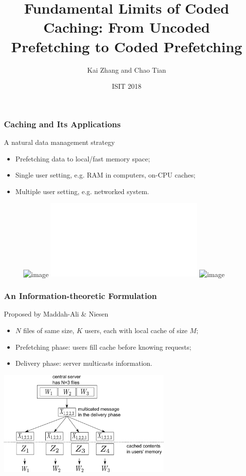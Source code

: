 \documentclass{beamer}
\title[About Beamer] %
{Fundamental Limits of Coded Caching: From Uncoded Prefetching to Coded Prefetching}
\author{Kai Zhang and Chao Tian}
\institute{Texas A\&M University}
\date{ISIT 2018}
\begin{document}
\frame{\titlepage}

\begin{frame}
\frametitle{Caching and Its Applications}

  A natural data management strategy
  \begin{itemize}
  \item Prefetching data to local/fast memory space;
  \item<2-> Single user setting, e.g. RAM in computers, on-CPU caches;
  \item<3> Multiple user setting, e.g. networked system.
  \end{itemize}
  
  
  \begin{figure}
  \centering
   	 \includegraphics<1>[height=4cm]{networkCaching0.jpg}
 	\includegraphics<2>[height=4cm]{cacheonRAM.pdf}
  	\includegraphics<3>[height=4cm]{contentcache}%
\end{figure}
\end{frame}

\begin{frame}
\frametitle{An Information-theoretic Formulation}
  Proposed by Maddah-Ali \& Niesen\footnotemark
  \begin{itemize}
  \item $N$ files of same size, $K$ users, each with local cache of size $M$;
  \item<2>Prefetching phase: users fill cache before knowing requests;
  \item<2> Delivery phase: server multicasts information.
  \end{itemize}
  \vspace{0.3cm}
  \centering
  \includegraphics[width=0.65\textwidth]{system_diag}
\end{frame}
\end{document}
